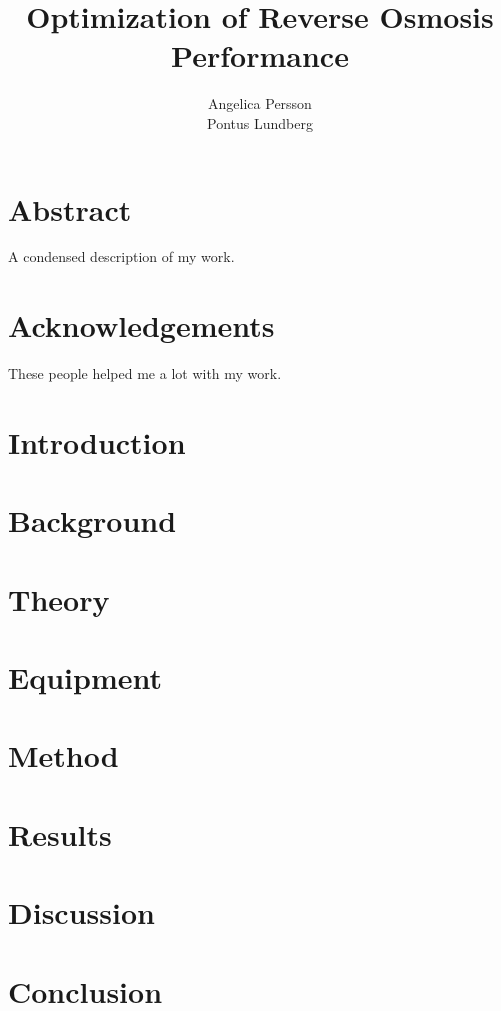 \documentclass{LTHthesis}
\begin{document}
\begin{titlepages}
\author{Angelica Persson \\ Pontus Lundberg}
\title{Optimization of Reverse Osmosis Performance}
\end{titlepages}
\chapter*{Abstract}
A condensed description of my work.
\chapter*{Acknowledgements}
These people helped me a lot with my work.
\tableofcontents

\chapter{Introduction}


\chapter{Background}


\chapter{Theory}


\chapter{Equipment}


\chapter{Method}


\chapter{Results}


\chapter{Discussion}


\chapter{Conclusion}



\printbibliography  %
\end{document}
